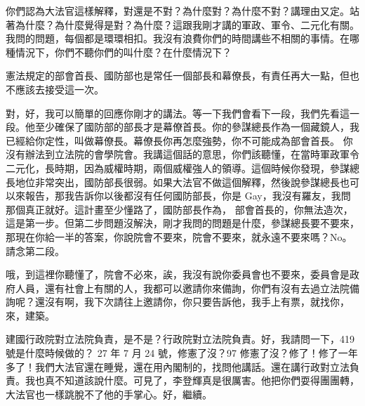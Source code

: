 \hypertarget{c08:cue:203}{}你們認為大法官這樣解釋，對還是不對？為什麼對？為什麼不對？講理由又定。站著為什麼？為什麼覺得是對？為什麼？這跟我剛才講的軍政、軍令、二元化有關。我問的問題，每個都是環環相扣。我沒有浪費你們的時間講些不相關的事情。在哪種情況下，你們不聽你們的叫什麼？在什麼情況下？

\hypertarget{c08:cue:204}{}憲法規定的部會首長、國防部也是常任一個部長和幕僚長，有責任再大一點，但也不應該去接受這一次。

\hypertarget{c08:cue:205}{}對，好，我可以簡單的回應你剛才的講法。等一下我們會看下一段，我們先看這一段。他至少確保了國防部的部長才是幕僚首長。你的參謀總長作為一個藏鏡人，我已經給你定性，叫做幕僚長。幕僚長你再怎麼強勢，你不可能成為部會首長。
\hypertarget{c08:cue:206}{}你沒有辦法到立法院的會學院會。我講這個話的意思，你們該聽懂，在當時軍政軍令二元化，長時期，因為威權時期，兩個威權強人的領導。這個時候你發現，參謀總長地位非常突出，國防部長很弱。如果大法官不做這個解釋，然後說參謀總長也可以來報告，那我告訴你以後都沒有任何國防部長，你是 Gay，我沒有羅友，我問那個真正就好。這計畫至少懂路了，國防部長作為，
\hypertarget{c08:cue:207}{}部會首長的，你無法造次，這是第一步。但第二步問題沒解決，剛才我問的問題是什麼，參謀總長要不要來，那現在你給一半的答案，你說院會不要來，院會不要來，就永遠不要來嗎？No。請念第二段。

\hypertarget{c08:cue:208}{}哦，到這裡你聽懂了，院會不必來，誒，我沒有說你委員會也不要來，委員會是政府人員，還有社會上有關的人，我都可以邀請你來備詢，你們有沒有去過立法院備詢呢？還沒有啊，我下次請往上邀請你，你只要告訴他，我手上有票，就找你，來，建築。

\hypertarget{c08:cue:209}{}建國行政院對立法院負責，是不是？行政院對立法院負責。好，我請問一下，419 號是什麼時候做的？
\hypertarget{c08:cue:210}{}27 年 7 月 24 號，修憲了沒？97 修憲了沒？修了！修了一年多了！我們大法官還在睡覺，還在用內閣制的，找問他講話。還在講行政對立法負責。我也真不知道該說什麼。可見了，李登輝真是很厲害。他把你們耍得團團轉，大法官也一樣跳脫不了他的手掌心。好，繼續。

